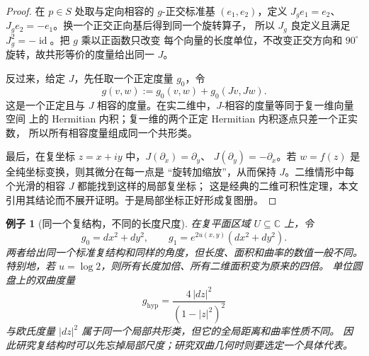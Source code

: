 \documentclass[UTF8,fontset=none,a4paper,11pt]{ctexart}
\theoremstyle{foundation-definition}
\theoremstyle{foundation-theorem}
\theoremstyle{foundation-proposition}
\theoremstyle{foundation-example}
\newtheorem{example}[definition]{例子}
\theoremstyle{foundation-remark}
\theoremstyle{foundation-theorem}
\begin{document}
\begin{proof}
在 \(p\in S\) 处取与定向相容的 \(g\)-正交标准基 \((e_1,e_2)\)，定义
\(J_ge_1=e_2\)、\(J_ge_2=-e_1\)。换一个正交正向基后得到同一个旋转算子，
所以 \(J_g\) 良定义且满足 \(J_g^2=-\operatorname{id}\)。把 \(g\) 乘以正函数只改变
每个向量的长度单位，不改变正交方向和 \(90^\circ\) 旋转，故共形等价的度量给出同一 \(J\)。

反过来，给定 \(J\)，先任取一个正定度量 \(g_0\)，令
\[
g(v,w):=g_0(v,w)+g_0(Jv,Jw).
\]
这是一个正定且与 \(J\) 相容的度量。在实二维中，\(J\)-相容的度量等同于复一维向量空间
上的 Hermitian 内积；复一维的两个正定 Hermitian 内积逐点只差一个正实数，
所以所有相容度量组成同一个共形类。

最后，在复坐标 \(z=x+iy\) 中，\(J(\partial_x)=\partial_y\)、
\(J(\partial_y)=-\partial_x\)。若 \(w=f(z)\) 是全纯坐标变换，则其微分在每一点是
“旋转加缩放”，从而保持 \(J\)。二维情形中每个光滑的相容 \(J\) 都能找到这样的局部复坐标；
这是经典的二维可积性定理，本文引用其结论而不展开证明。于是局部坐标正好形成复图册。
\end{proof}

\begin{example}[同一个复结构，不同的长度尺度]\label{ex:conformal-scaling-same-complex}
在复平面区域 \(U\subseteq\mathbb C\) 上，令
\[
g_0=dx^2+dy^2,\qquad g_1=e^{2u(x,y)}(dx^2+dy^2).
\]
两者给出同一个标准复结构和同样的角度，但长度、面积和曲率的数值一般不同。
特别地，若 \(u=\log 2\)，则所有长度加倍、所有二维面积变为原来的四倍。
单位圆盘上的双曲度量
\[
g_{\mathrm{hyp}}=\frac{4\,|dz|^2}{(1-|z|^2)^2}
\]
与欧氏度量 \( |dz|^2\) 属于同一个局部共形类，但它的全局距离和曲率性质不同。
因此研究复结构时可以先忘掉局部尺度；研究双曲几何时则要选定一个具体代表。
\end{example}
\end{document}
